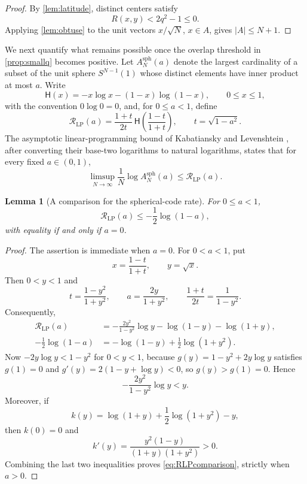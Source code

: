 \documentclass[11pt,reqno]{amsart}
\numberwithin{equation}{section}
\theoremstyle{plain}
\newtheorem{lemma}[lemma]{Lemma}
\theoremstyle{definition}
\theoremstyle{remark}
\newcommand{\1}{\mathbf 1}
\newcommand{\Hbin}{\mathsf H}
\begin{document}
\begin{proof}
By \cref{lem:latitude}, distinct centers satisfy
\[
 R(x,y)<2q^2-1\leq0.
\]
Applying \cref{lem:obtuse} to the unit vectors \(x/\sqrt N\), \(x\in A\), gives \(\lvert A\rvert\leq N+1\).
\end{proof}

We next quantify what remains possible once the overlap threshold in
\cref{prop:smallq} becomes positive.  Let \(A_N^{\mathrm{sph}}(a)\)
denote the largest cardinality of a subset of the unit sphere
\(S^{N-1}(1)\) whose distinct elements have inner product at most
\(a\).  Write
\[
 \Hbin(x)=-x\log x-(1-x)\log(1-x),
 \qquad 0\leq x\leq1,
\]
with the convention \(0\log0=0\), and, for \(0\leq a<1\), define
\begin{equation}\label{eq:RLP}
 \mathcal R_{\mathrm{LP}}(a)
 =\frac{1+t}{2t}\,
 \Hbin\left(\frac{1-t}{1+t}\right),
 \qquad t=\sqrt{1-a^2}.
\end{equation}
The asymptotic linear-programming bound of Kabatiansky and Levenshtein
\cite[Theorem~4 and Equation~(54)]{KabatianskyLevenshtein1978}, after
converting their base-two logarithms to natural logarithms, states that
for every fixed \(a\in(0,1)\),
\begin{equation}\label{eq:KLcodeBound}
 \limsup_{N\to\infty}\frac1N\log A_N^{\mathrm{sph}}(a)
 \leq\mathcal R_{\mathrm{LP}}(a).
\end{equation}

\begin{lemma}[A comparison for the spherical-code rate]
\label{lem:RLPcomparison}
For \(0\leq a<1\),
\begin{equation}\label{eq:RLPcomparison}
 \mathcal R_{\mathrm{LP}}(a)
 \leq-\frac12\log(1-a),
\end{equation}
with equality if and only if \(a=0\).
\end{lemma}

\begin{proof}
The assertion is immediate when \(a=0\).  For \(0<a<1\), put
\[
 x=\frac{1-t}{1+t},\qquad y=\sqrt{x}.
\]
Then \(0<y<1\) and
\[
 t=\frac{1-y^2}{1+y^2},\qquad
 a=\frac{2y}{1+y^2},\qquad
 \frac{1+t}{2t}=\frac1{1-y^2}.
\]
Consequently,
\begin{align*}
 \mathcal R_{\mathrm{LP}}(a)
 &=-\frac{2y^2}{1-y^2}\log y-\log(1-y)-\log(1+y),\\
 -\frac12\log(1-a)
 &=-\log(1-y)+\frac12\log(1+y^2).
\end{align*}
Now \(-2y\log y<1-y^2\) for \(0<y<1\), because
\(g(y)=1-y^2+2y\log y\) satisfies \(g(1)=0\) and
\(g'(y)=2(1-y+\log y)<0\), so \(g(y)>g(1)=0\).  Hence
\[
 -\frac{2y^2}{1-y^2}\log y<y.
\]
Moreover, if
\[
 k(y)=\log(1+y)+\frac12\log(1+y^2)-y,
\]
then \(k(0)=0\) and
\[
 k'(y)=\frac{y^2(1-y)}{(1+y)(1+y^2)}>0.
\]
Combining the last two inequalities proves
\eqref{eq:RLPcomparison}, strictly when \(a>0\).
\end{proof}
\end{document}
